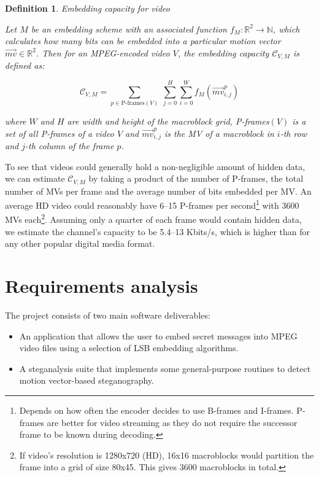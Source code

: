 \documentclass[12pt,british,twoside,notitlepage,usenames,dvipsnames,hypens,final]{report}
\newtheorem{definition}{Definition}
\numberwithin{equation}{section}
\numberwithin{figure}{section}
\begin{document}
\begin{definition}{Embedding capacity for video}

Let $M$ be an embedding scheme with an associated function $f_M : \mathbb{R}^2 \rightarrow \mathbb{N}$, which calculates how many bits can be embedded into a particular motion vector $\overrightarrow{mv} \in \mathbb{R}^2$. Then for an MPEG-encoded video $V$, the embedding capacity $\mathcal{C}_{V, M}$ is defined as:

$$ \mathcal{C}_{V, M} = \sum_{p \in \text{P-frames}(V)} \: \sum^{H}_{j = 0} \sum^{W}_{i = 0} f_M(\overrightarrow{mv}^p_{i, j})$$

where $W$ and $H$ are width and height of the macroblock grid, P-frames$(V)$ is a set of all P-frames of a video $V$ and $\overrightarrow{mv}^p_{i, j}$ is the MV of a macroblock  in $i$-th row and $j$-th column of the frame $p$.

\end{definition}

To see that videos could generally hold a non-negligible amount of hidden data, we can estimate $\mathcal{C}_{V, M}$ by taking a product of the number of P-frames, the total number of MVs per frame and the average number of bits embedded per MV. An average HD video could reasonably have 6--15 P-frames per second\footnote{Depends on how often the encoder decides to use B-frames and I-frames. P-frames are better for video streaming as they do not require the successor frame to be known during decoding.} with 3600 MVs each\footnote{If video's resolution is 1280x720 (HD), 16x16 macroblocks would partition the frame into a grid of size 80x45. This gives 3600 macroblocks in total.}. Assuming only a quarter of each frame would contain hidden data, we estimate the channel's capacity to be 5.4--13 Kbits/s, which is higher than for any other popular digital media format.

\section{Requirements analysis}

The project consists of two main software deliverables:
\begin{itemize}
\item  An application that allows the user to embed secret messages into MPEG video files using a selection of LSB embedding algorithms.
\item A steganalysis suite that implements some general-purpose routines to detect motion vector-based steganography.
\end{itemize}
\end{document}

